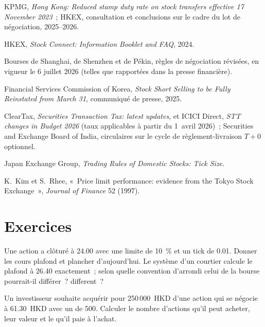\begin{omsources}
\item KPMG, \emph{Hong Kong: Reduced stamp duty rate on stock transfers
effective 17 November 2023}~; HKEX, consultation et conclusions sur le
cadre du lot de négociation, 2025--2026.
\item HKEX, \emph{Stock Connect: Information Booklet and FAQ}, 2024.
\item Bourses de Shanghai, de Shenzhen et de Pékin, règles de négociation
révisées, en vigueur le 6 juillet 2026 (telles que rapportées dans la presse financière).
\item Financial Services Commission of Korea, \emph{Stock Short Selling to be
Fully Reinstated from March 31}, communiqué de presse, 2025.
\item ClearTax, \emph{Securities Transaction Tax: latest updates}, et ICICI
Direct, \emph{STT changes in Budget 2026} (taux applicables à partir du 1~avril 2026)~;
Securities and Exchange Board of India, circulaires sur le cycle de
règlement-livraison $T{+}0$ optionnel.
\item Japan Exchange Group, \emph{Trading Rules of Domestic Stocks: Tick
Size}.
\item K.~Kim et S.~Rhee, «~Price limit performance: evidence from the Tokyo
Stock Exchange~», \emph{Journal of Finance} 52 (1997).
\end{omsources}

\section{Exercices}

\begin{exercise}[$\star$]\label{exo:m1:asian-and-emerging-equity-markets:1}
Une action a clôturé à 24.00 avec une limite de 10~\% et un tick de 0.01.
Donner les cours plafond et plancher d'aujourd'hui. Le système d'un courtier calcule le plafond
à 26.40 exactement~; selon quelle convention d'arrondi celui de la bourse pourrait-il différer~?
different~?
\end{exercise}

\begin{exercise}[$\star$]\label{exo:m1:asian-and-emerging-equity-markets:2}
Un investisseur souhaite acquérir pour 250\,000~HKD d'une action qui se négocie à 61.30~HKD
avec un  de 500. Calculer le nombre d'actions qu'il peut acheter, leur valeur
et le  qu'il paie à l'achat.
\end{exercise}

